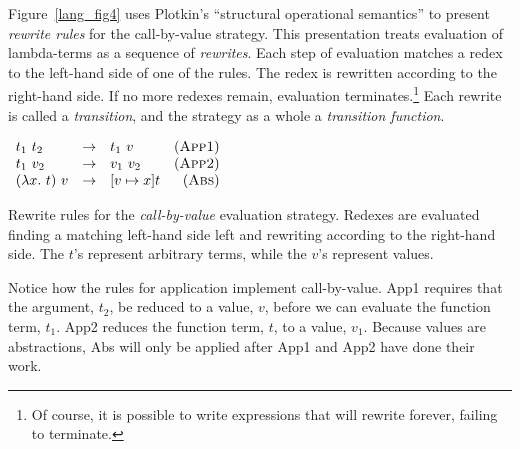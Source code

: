\documentclass[12pt]{report}
\begin{document}
Figure~\ref{lang_fig4} uses Plotkin's ``structural operational
semantics'' \citep{PlotkinXX} to pre\-sent \emph{rewrite rules} for the
call-by-value strategy. This presentation treats evaluation of
lambda-terms as a sequence of \emph{rewrites}. Each step of evaluation
matches a redex to the left-hand side of one of the rules. The redex
is rewritten according to the right-hand side. If no more redexes
remain, evaluation terminates.\footnote{Of course, it is possible to
  write expressions that will rewrite forever, failing to terminate.}
Each rewrite is called a \emph{transition}, and the strategy as a
whole a \emph{transition function}.

\begin{myfig}[tbh]
\begin{minipage}{2.5in}
  \begin{math}
    \begin{array}{lclr}
      t_1\ t_2 & \rightarrow & t_1\ v & (\text{\sc App1}) \\
      t_1\ v_2 & \rightarrow & v_1\ v_2 & (\text{\sc App2}) \\
      (\lambda x.\ t)\ v & \rightarrow & [v \mapsto x] t & (\text{\sc Abs})
    \end{array}
  \end{math}
\end{minipage}
  \caption{Rewrite rules for the \emph{call-by-value} evaluation
    strategy. Redexes are evaluated finding a matching left-hand side
    left and rewriting according to the right-hand side. The $t$'s
    represent arbitrary terms, while the $v$'s represent values.}
  \label{lang_fig4}
\end{myfig}

Notice how the rules for application implement call-by-value. {\sc
  App1} requires that the argument, $t_2$, be reduced to a value, $v$,
before we can evaluate the function term, $t_1$. {\sc App2} reduces
the function term, $t$, to a value, $v_1$. Because values are
abstractions, {\sc Abs} will only be applied after {\sc App1} and {\sc
  App2} have done their work.

\end{document}
